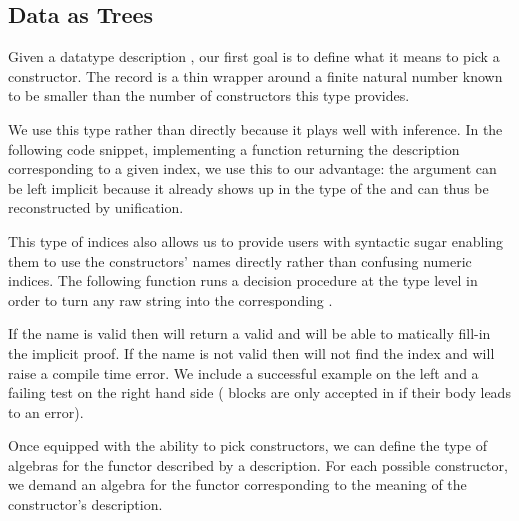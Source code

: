 \subsection{Data as Trees}

Given a datatype description , our first goal is
to define what it means to pick a constructor.
%
The  record is a thin wrapper around a finite
natural number known to be smaller than the number of constructors
this type provides.


We use this type rather than  directly because it
plays well with inference.
%
In the following code snippet, implementing a function returning
the description corresponding to a given index,
we use this to our advantage:
the  argument can be left implicit because it already
shows up in the type of the  and can thus be
reconstructed by unification.


This type of indices also allows us to provide users with
syntactic sugar enabling them to use the constructors' names
directly rather than confusing numeric indices.
%
The following function runs a decision procedure
 at the type level
in order to turn any raw string 
into the corresponding .


If the name is valid then  will
return a valid  and \idris{} will be able to
matically fill-in the implicit proof.
%
If the name is not valid then \idris{} will not
find the index and will raise a compile time error.
%
We include a successful example on the left and a failing test
on the right hand side ( blocks are only
accepted in \idris{} if their body leads to an error).

\noindent
\begin{minipage}[t]{0.35\textwidth}
\end{minipage}\hfill
\begin{minipage}[t]{0.42\textwidth}
\end{minipage}

Once equipped with the ability to pick constructors, we can define
the type of algebras for the functor described by a 
description. For each possible constructor, we demand an algebra for
the functor corresponding to the meaning of the  constructor's description.

